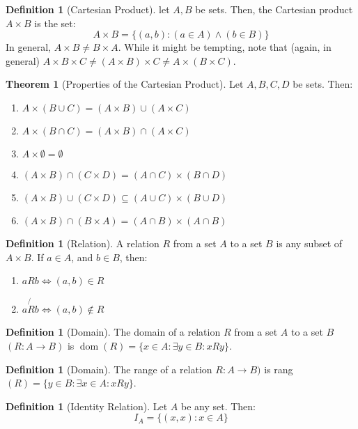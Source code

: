 \documentclass[10pt]{article}
\theoremstyle{definition}
\newtheorem{definition}[equation]{Definition}
\newtheorem{theorem}[equation]{Theorem}
\DeclareMathOperator\dom{dom}
\begin{document}
\begin{definition}[Cartesian Product]
  let $A,B$ be sets. Then, the Cartesian product $A\times B$ is the set:
  $$A\times B = \{(a,b): (a\in A) \land (b\in B)\}$$
  In general, $A\times B \neq B\times A$.
  While it might be tempting, note that (again, in general) $A\times B\times C \neq (A\times B) \times C \neq A\times (B\times C)$.
\end{definition}

\begin{theorem}[Properties of the Cartesian Product]
  Let $A,B,C,D$ be sets. Then:
  \begin{enumerate}
    \item $A\times(B\cup C) = (A\times B)\cup(A\times C)$
    \item $A\times(B\cap C) = (A\times B)\cap(A\times C)$
    \item $A\times \emptyset = \emptyset$
    \item $(A\times B)\cap(C\times D) = (A\cap C)\times(B\cap D)$
    \item $(A\times B)\cup(C\times D) \subseteq (A\cup C)\times(B\cup D)$
    \item $(A\times B)\cap(B\times A) = (A\cap B)\times(A\cap B)$
  \end{enumerate}
\end{theorem}

\begin{definition}[Relation]
  A relation $R$ from a set $A$ to a set $B$ is any subset of $A\times B$.
  If $a\in A$, and $b\in B$, then:
  \begin{enumerate}
    \item $aRb \iff (a,b)\in R$
    \item $a\not{R}b \iff (a,b)\not\in R$
  \end{enumerate}
\end{definition}

\begin{definition}[Domain]
  The domain of a relation $R$ from a set $A$ to a set $B$ $(R: A\rightarrow B)$ is $\dom(R) = \{x\in A: \exists y\in B : xRy\}$.
\end{definition}

\begin{definition}[Domain]
  The range of a relation $R: A\rightarrow B)$ is rang$(R) = \{y\in B: \exists x\in A : xRy\}$.
\end{definition}

\begin{definition}[Identity Relation]
  Let $A$ be any set. Then:
  $$I_A = \{(x,x): x\in A\}$$
\end{definition}
\end{document}
